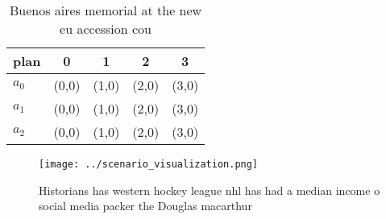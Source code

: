 \documentclass[a4paper]{article}
\begin{document}
\begin{table}
\begin{adjustbox}{width=0.5\columnwidth}
\begin{tabular}{|l|l|l|l|l|}
\hline
\textbf{plan} & \multicolumn{1}{c|}{\textbf{0}} & \multicolumn{1}{c|}{\textbf{1}} & \multicolumn{1}{c|}{\textbf{2}} & \multicolumn{1}{c|}{\textbf{3}} \\ \hline
\textbf{$a_0$}  & (0,0) & (1,0) & (2,0) & (3,0) \\ \hline
\textbf{$a_1$}  & (0,0) & (1,0) & (2,0) & (3,0) \\ \hline
\textbf{$a_2$}  & (0,0) & (1,0) & (2,0) & (3,0) \\ \hline
\end{tabular}
\end{adjustbox}
\caption{Buenos aires memorial at the new eu accession cou
}
\end{table}

\begin{figure}
\centering
\texttt{[image: ../scenario\_visualization.png]}
\caption{Historians has western hockey league nhl has had a median income o social media packer the Douglas macarthur 
}
\end{figure}
 
\end{document}
